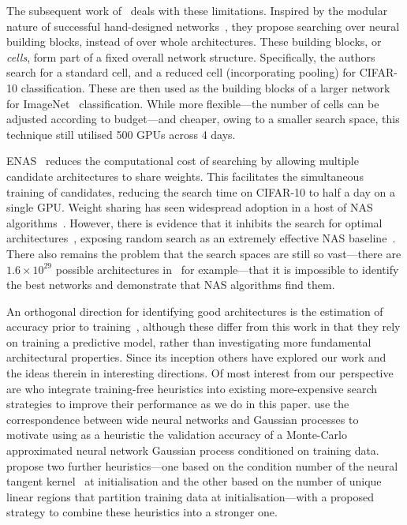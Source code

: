\documentclass{article}
\begin{document}
The subsequent work of~\cite{zoph2018learning} deals with these limitations. Inspired by the modular nature of successful hand-designed networks~\citep{simonyan2015very,he2016deep,huang2017densely}, they propose searching over neural building blocks, instead of over whole architectures. These building blocks, or {\it cells}, form part of a fixed overall network structure. Specifically, the authors search for a standard cell, and a reduced cell (incorporating pooling) for CIFAR-10 classification. These are then used as the building blocks of a larger network for ImageNet~\citep{russakovsky2015imagenet} classification. While more flexible---the number of cells can be adjusted according to budget---and cheaper, owing to a smaller search space, this technique still utilised 500 GPUs across 4 days.

ENAS~\citep{pham2018efficient} reduces the computational cost of searching by allowing multiple candidate architectures to share weights. This facilitates the simultaneous training of candidates, reducing the search time on CIFAR-10 to half a day on a single GPU. Weight sharing has seen widespread adoption in a host of NAS algorithms~\citep{liu2019darts,luo2018neural,cai2019proxylessnas,xie2019snas,brock2018smash}. However, there is evidence that it inhibits the search for optimal architectures~\citep{yu2020evaluating}, exposing random search as an extremely effective NAS baseline~\citep{yu2020evaluating,li2019random}. There also remains the problem that the search spaces are still so vast---there are $1.6\times 10^{29}$ possible architectures in~\cite{pham2018efficient} for example---that it is impossible to identify the best networks and  demonstrate that NAS algorithms find them.

An orthogonal direction for identifying good architectures is the estimation of accuracy prior to training~\citep{deng2017peephole,istrate2019tapas}, although these differ from this work in that they rely on training a predictive model, rather than investigating more fundamental architectural properties. 
Since its inception others have explored our work and the ideas therein in interesting directions. Of most interest from our perspective are \citet{abdelfattah2021zerocost} who integrate training-free heuristics into existing more-expensive search strategies to improve their performance  as we do in this paper. 
\citet{park2020towards} use the correspondence between wide neural networks and Gaussian processes to motivate using as a heuristic the validation accuracy of a Monte-Carlo approximated neural network Gaussian process conditioned on training data. \citet{chen2021neural} propose two further heuristics---one based on the condition number of the neural tangent kernel~\citep{jacot2018neural} at initialisation and the other based on the number of unique linear regions that partition training data at initialisation---with a proposed strategy to combine these heuristics into a stronger one.
\end{document}
